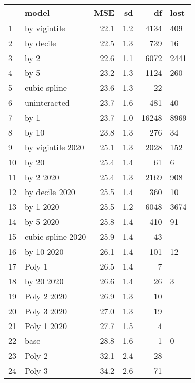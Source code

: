 \begin{table}[ht]
\centering
\begin{tabular}{llrrrl}
  \hline
 & model & MSE & sd & df & lost \\ 
  \hline
1 & by vigintile & 22.1 & 1.2 & 4134 &  409 \\ 
  2 & by decile & 22.5 & 1.3 & 739 &   16 \\ 
  3 & by 2 & 22.6 & 1.1 & 6072 & 2441 \\ 
  4 & by 5 & 23.2 & 1.3 & 1124 &  260 \\ 
  5 & cubic spline & 23.6 & 1.3 & 22 &  \\ 
  6 & uninteracted & 23.7 & 1.6 & 481 &   40 \\ 
  7 & by 1 & 23.7 & 1.0 & 16248 & 8969 \\ 
  8 & by 10 & 23.8 & 1.3 & 276 &   34 \\ 
  9 & by vigintile 2020 & 25.1 & 1.3 & 2028 &  152 \\ 
  10 & by 20 & 25.4 & 1.4 & 61 &    6 \\ 
  11 & by 2 2020 & 25.4 & 1.3 & 2169 &  908 \\ 
  12 & by decile 2020 & 25.5 & 1.4 & 360 &   10 \\ 
  13 & by 1 2020 & 25.5 & 1.2 & 6048 & 3674 \\ 
  14 & by 5 2020 & 25.8 & 1.4 & 410 &   91 \\ 
  15 & cubic spline 2020 & 25.9 & 1.4 & 43 &  \\ 
  16 & by 10 2020 & 26.1 & 1.4 & 101 &   12 \\ 
  17 & Poly 1 & 26.5 & 1.4 & 7 &  \\ 
  18 & by 20 2020 & 26.6 & 1.4 & 26 &    3 \\ 
  19 & Poly 2 2020 & 26.9 & 1.3 & 10 &  \\ 
  20 & Poly 3 2020 & 27.0 & 1.3 & 19 &  \\ 
  21 & Poly 1 2020 & 27.7 & 1.5 & 4 &  \\ 
  22 & base & 28.8 & 1.6 & 1 &    0 \\ 
  23 & Poly 2 & 32.1 & 2.4 & 28 &  \\ 
  24 & Poly 3 & 34.2 & 2.6 & 71 &  \\ 
   \hline
\end{tabular}
\end{table}
